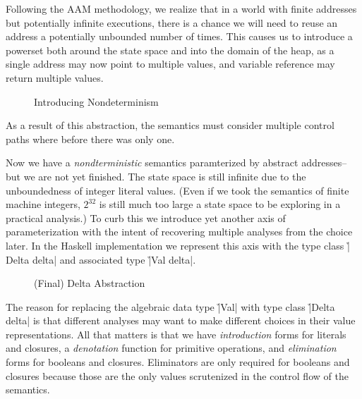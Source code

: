 
Following the AAM methodology, we realize that in a world with finite addresses
but potentially infinite executions, there is a chance we will need to reuse an
address a potentially unbounded number of times.
%
This causes us to introduce a powerset both around the state space and into the
domain of the heap, as a single address may now point to multiple values, and
variable reference may return multiple values.
%
\begin{figure}[H]
\caption*{Introducing Nondeterminism}
\end{figure}
\noindent
%
As a result of this abstraction, the semantics must consider multiple control
paths where before there was only one.


Now we have a \textit{nondterministic} semantics paramterized by abstract
addresses--but we are not yet finished.
%
The state space is still infinite due to the unboundedness of integer literal
values.
%
(Even if we took the semantics of finite machine integers, $2^{32}$ is still much
too large a state space to be exploring in a practical analysis.)
%
To curb this we introduce yet another axis of parameterization with the intent
of recovering multiple analyses from the choice later.
%
In the Haskell implementation we represent this axis with the type class
\h|Delta delta| and associated type \h|Val delta|.
%
\begin{figure}[H]
\caption*{(Final) Delta Abstraction}
\end{figure}
\noindent
%
The reason for replacing the algebraic data type \h|Val| with type class
\h|Delta delta| is that different analyses may want to make different choices
in their value representations.
%
All that matters is that we have \textit{introduction} forms for literals and
closures, a \textit{denotation} function for primitive operations, and
\textit{elimination} forms for booleans and closures.
%
Eliminators are only required for booleans and closures because those are the
only values scrutenized in the control flow of the semantics.
